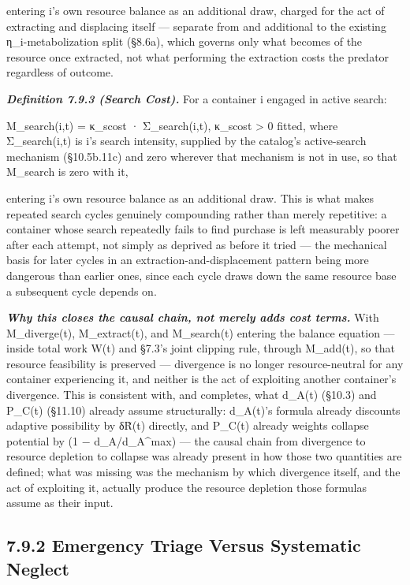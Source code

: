 \documentclass[
]{article}
\begin{document}
entering i's own resource balance as an additional draw, charged for the
act of extracting and displacing itself --- separate from and additional
to the existing η\_i-metabolization split (§8.6a), which governs only
what becomes of the resource once extracted, not what performing the
extraction costs the predator regardless of outcome.

\emph{\textbf{Definition 7.9.3 (Search Cost).}} For a container i
engaged in active search:

M\_search(i,t) = κ\_scost · Σ\_search(i,t), κ\_scost \textgreater{} 0
fitted, where Σ\_search(i,t) is i's search intensity, supplied by the
catalog's active-search mechanism (§10.5b.11c) and zero wherever that
mechanism is not in use, so that M\_search is zero with it,

entering i's own resource balance as an additional draw. This is what
makes repeated search cycles genuinely compounding rather than merely
repetitive: a container whose search repeatedly fails to find purchase
is left measurably poorer after each attempt, not simply as deprived as
before it tried --- the mechanical basis for later cycles in an
extraction-and-displacement pattern being more dangerous than earlier
ones, since each cycle draws down the same resource base a subsequent
cycle depends on.

\emph{\textbf{Why this closes the causal chain, not merely adds cost
terms.}} With M\_diverge(t), M\_extract(t), and M\_search(t) entering
the balance equation --- inside total work W(t) and §7.3's joint
clipping rule, through M\_add(t), so that resource feasibility is
preserved --- divergence is no longer resource-neutral for any container
experiencing it, and neither is the act of exploiting another
container's divergence. This is consistent with, and completes, what
d\_A(t) (§10.3) and P\_C(t) (§11.10) already assume structurally:
d\_A(t)'s formula already discounts adaptive possibility by δR̃(t)
directly, and P\_C(t) already weights collapse potential by (1 −
d\_A/d\_A\^{}max) --- the causal chain from divergence to resource
depletion to collapse was already present in how those two quantities
are defined; what was missing was the mechanism by which divergence
itself, and the act of exploiting it, actually produce the resource
depletion those formulas assume as their input.

\hypertarget{emergency-triage-versus-systematic-neglect}{%
\subsection{7.9.2 Emergency Triage Versus Systematic
Neglect}\label{emergency-triage-versus-systematic-neglect}}
\end{document}
